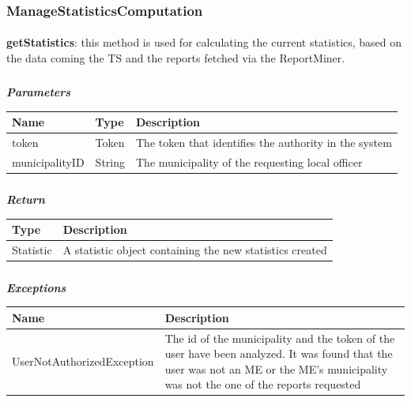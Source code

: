 				\subsubsection{ManageStatisticsComputation}
					\paragraph{}
							\textbf{getStatistics}: this method is used for calculating the current statistics, based on the data coming the TS and the reports fetched via the ReportMiner.
							\clearpage
							\subparagraph{}
							\textit{\textbf{Parameters}}
							\vspace{-2mm}
								\begin{table}[!h]
									\begin{tabular}{L{0.2\textwidth}L{0.15\textwidth}L{0.45\textwidth}}
										\toprule
										\textbf{Name} & \textbf{Type} & \textbf{Description} \\
										\midrule
								  		token & Token & The token that identifies the authority in the system \\
								  		municipalityID & String & The municipality of the requesting local officer \\
								 		\bottomrule
									\end{tabular}
								\end{table}
							\subparagraph{}
							\vspace{-6mm}
								\textit{\textbf{Return}}
								\vspace{-2mm}
									\begin{table}[!h]
									\begin{tabular}{L{0.2\textwidth}L{0.6\textwidth}}
										\toprule
										\textbf{Type} & \textbf{Description} \\
										\midrule
								  		Statistic & A statistic object containing the new statistics created \\
								 		\bottomrule
									\end{tabular}
								\end{table}
							\subparagraph{}
							\vspace{-6mm}
								\textit{\textbf{Exceptions}}
								\vspace{-2mm}
									\begin{table}[!h]
									\begin{tabular}{L{0.4\textwidth}L{0.4\textwidth}}
										\toprule
										\textbf{Name} & \textbf{Description} \\
										\midrule
								  	UserNotAuthorizedException & The id of the municipality and the token of the user have been analyzed. It was found that the user was not an ME or the ME's  municipality was not the one of the reports requested  \\
								 		\bottomrule
									\end{tabular}
								\end{table}

